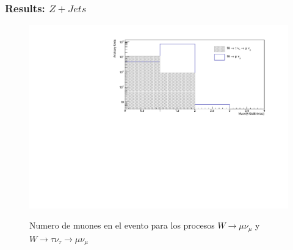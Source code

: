 \documentclass{beamer}
\numberwithin{figure}{section}
\begin{document}

\begin{frame}
\frametitle{Results: $Z+Jets$} 

\begin{figure}[!tbp]
	\centering
	\includegraphics[width=1.0\textwidth]{pictures/MuonsSizeLog}\label{fig:f1}
	\caption{\scriptsize{ Numero de muones en el evento para los procesos $W \rightarrow \mu \nu_{\mu}$ y $W \rightarrow \tau \nu_{\tau} \rightarrow \mu \nu_{\mu}$}}
\end{figure}


\end{frame}



\end{document}
